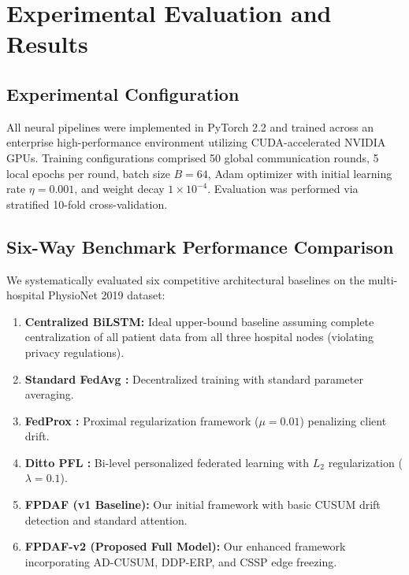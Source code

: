 \documentclass[journal,twocolumn,10pt]{IEEEtran}
\begin{document}
\section{Experimental Evaluation and Results}
\subsection{Experimental Configuration}
All neural pipelines were implemented in PyTorch 2.2 and trained across an enterprise high-performance environment utilizing CUDA-accelerated NVIDIA GPUs. Training configurations comprised 50 global communication rounds, 5 local epochs per round, batch size $B = 64$, Adam optimizer with initial learning rate $\eta = 0.001$, and weight decay $1 \times 10^{-4}$. Evaluation was performed via stratified 10-fold cross-validation.

\subsection{Six-Way Benchmark Performance Comparison}
We systematically evaluated six competitive architectural baselines on the multi-hospital PhysioNet 2019 dataset:
\begin{enumerate}
    \item \textbf{Centralized BiLSTM:} Ideal upper-bound baseline assuming complete centralization of all patient data from all three hospital nodes (violating privacy regulations).
    \item \textbf{Standard FedAvg \cite{mcmahan2017}:} Decentralized training with standard parameter averaging.
    \item \textbf{FedProx \cite{li2020fedprox}:} Proximal regularization framework ($\mu = 0.01$) penalizing client drift.
    \item \textbf{Ditto PFL \cite{li2021ditto}:} Bi-level personalized federated learning with $L_2$ regularization ($\lambda = 0.1$).
    \item \textbf{FPDAF (v1 Baseline):} Our initial framework with basic CUSUM drift detection and standard attention.
    \item \textbf{FPDAF-v2 (Proposed Full Model):} Our enhanced framework incorporating AD-CUSUM, DDP-ERP, and CSSP edge freezing.
\end{enumerate}
\end{document}
